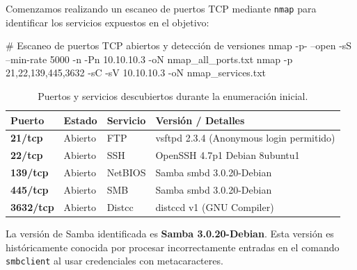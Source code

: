\documentclass[../../../main_compilation.tex]{subfiles}
\begin{document}
Comenzamos realizando un escaneo de puertos TCP mediante \texttt{nmap} para identificar los servicios expuestos en el objetivo:

\begin{terminal}
	# Escaneo de puertos TCP abiertos y detección de versiones
	nmap -p- --open -sS --min-rate 5000 -n -Pn 10.10.10.3 -oN nmap_all_ports.txt
	nmap -p 21,22,139,445,3632 -sC -sV 10.10.10.3 -oN nmap_services.txt
\end{terminal}

\begin{table}[h!]
	\centering
	\small
	\begin{tabularx}{\textwidth}{l l l X}
		\toprule
		\rowcolor{csecDark} \textbf{\color{white}Puerto} & \textbf{\color{white}Estado} & \textbf{\color{white}Servicio} & \textbf{\color{white}Versión / Detalles} \\
		\midrule
		\textbf{21/tcp}                                  & Abierto                      & FTP                            & vsftpd 2.3.4 (Anonymous login permitido) \\
		\textbf{22/tcp}                                  & Abierto                      & SSH                            & OpenSSH 4.7p1 Debian 8ubuntu1            \\
		\textbf{139/tcp}                                 & Abierto                      & NetBIOS                        & Samba smbd 3.0.20-Debian                 \\
		\textbf{445/tcp}                                 & Abierto                      & SMB                            & Samba smbd 3.0.20-Debian                 \\
		\textbf{3632/tcp}                                & Abierto                      & Distcc                         & distccd v1 (GNU Compiler)                \\
		\bottomrule
	\end{tabularx}
	\caption{Puertos y servicios descubiertos durante la enumeración inicial.}
\end{table}

\begin{notebox}
	La versión de Samba identificada es \textbf{Samba 3.0.20-Debian}. Esta versión es históricamente conocida por procesar incorrectamente entradas en el comando \texttt{smbclient} al usar credenciales con metacaracteres.
\end{notebox}

\end{document}
